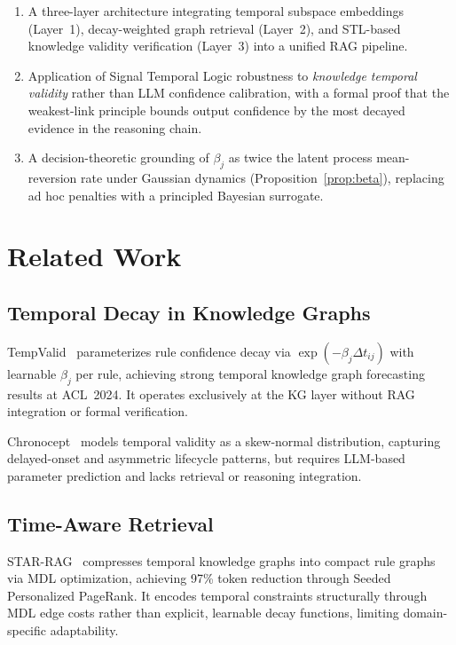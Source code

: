 \documentclass[conference]{IEEEtran}
\begin{document}
\begin{enumerate}
    \item A three-layer architecture integrating temporal subspace embeddings (Layer~1), decay-weighted graph retrieval (Layer~2), and STL-based knowledge validity verification (Layer~3) into a unified RAG pipeline.
    \item Application of Signal Temporal Logic robustness to \emph{knowledge temporal validity} rather than LLM confidence calibration, with a formal proof that the weakest-link principle bounds output confidence by the most decayed evidence in the reasoning chain.
    \item A decision-theoretic grounding of $\beta_j$ as twice the latent process mean-reversion rate under Gaussian dynamics (Proposition~\ref{prop:beta}), replacing ad hoc penalties with a principled Bayesian surrogate.
\end{enumerate}

\section{Related Work}

\subsection{Temporal Decay in Knowledge Graphs}

TempValid~\cite{huang2024tempvalid} parameterizes rule confidence decay via $\exp(-\beta_j \Delta t_{ij})$ with learnable $\beta_j$ per rule, achieving strong temporal knowledge graph forecasting results at ACL~2024. It operates exclusively at the KG layer without RAG integration or formal verification.

Chronocept~\cite{chronocept2025} models temporal validity as a skew-normal distribution, capturing delayed-onset and asymmetric lifecycle patterns, but requires LLM-based parameter prediction and lacks retrieval or reasoning integration.

\subsection{Time-Aware Retrieval}

STAR-RAG~\cite{zhu2025starrag} compresses temporal knowledge graphs into compact rule graphs via MDL optimization, achieving 97\% token reduction through Seeded Personalized PageRank. It encodes temporal constraints structurally through MDL edge costs rather than explicit, learnable decay functions, limiting domain-specific adaptability.
\end{document}

